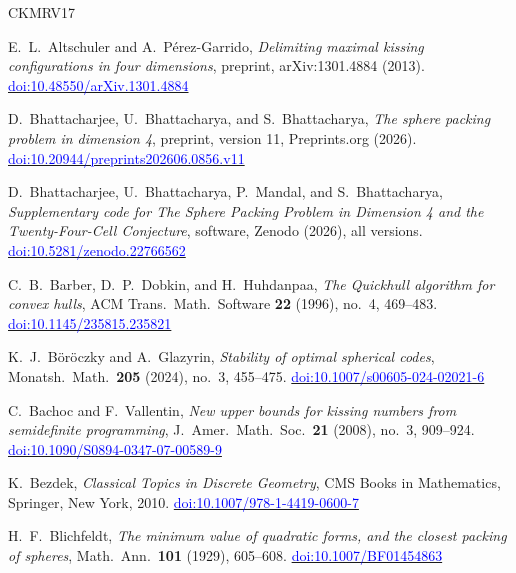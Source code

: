 \documentclass[11pt,reqno]{amsart}
\newcommand{\bluelink}[2]{\href{#1}{\textcolor{blue}{#2}}}
\renewcommand{\_}{\origunderscore\allowbreak}
\numberwithin{equation}{section}
\theoremstyle{plain}
\theoremstyle{definition}
\theoremstyle{remark}
\begin{document}



\begin{thebibliography}{CKMRV17}
\setlength{\itemsep}{-1.3pt}

E.~L.~Altschuler and A.~P\'erez-Garrido,
\textit{Delimiting maximal kissing configurations in four dimensions},
preprint, arXiv:1301.4884 (2013).
\bluelink{https://doi.org/10.48550/arXiv.1301.4884}{doi:10.48550/arXiv.1301.4884}

D.~Bhattacharjee, U.~Bhattacharya, and S.~Bhattacharya,
\textit{The sphere packing problem in dimension 4},
preprint, version 11, Preprints.org (2026).
\bluelink{https://doi.org/10.20944/preprints202606.0856.v11}{doi:10.20944/preprints202606.0856.v11}

D.~Bhattacharjee, U.~Bhattacharya, P.~Mandal, and S.~Bhattacharya,
\textit{Supplementary code for The Sphere Packing Problem in Dimension 4 and
the Twenty-Four-Cell Conjecture}, software, Zenodo (2026), all versions.
\bluelink{https://doi.org/10.5281/zenodo.22766562}{doi:10.5281/zenodo.22766562}

C.~B.~Barber, D.~P.~Dobkin, and H.~Huhdanpaa,
\textit{The Quickhull algorithm for convex hulls},
ACM Trans.\ Math.\ Software \textbf{22} (1996), no.~4, 469--483.
\bluelink{https://doi.org/10.1145/235815.235821}{doi:10.1145/235815.235821}

K.~J.~B\"or\"oczky and A.~Glazyrin, \textit{Stability of optimal spherical
codes}, Monatsh.\ Math.\ \textbf{205} (2024), no.~3, 455--475.
\bluelink{https://doi.org/10.1007/s00605-024-02021-6}{doi:10.1007/s00605-024-02021-6}

C.~Bachoc and F.~Vallentin,
\textit{New upper bounds for kissing numbers from semidefinite programming},
J.\ Amer.\ Math.\ Soc.\ \textbf{21} (2008), no.~3, 909--924.
\bluelink{https://doi.org/10.1090/S0894-0347-07-00589-9}{doi:10.1090/S0894-0347-07-00589-9}

K.~Bezdek,
\textit{Classical Topics in Discrete Geometry},
CMS Books in Mathematics, Springer, New York, 2010.
\bluelink{https://doi.org/10.1007/978-1-4419-0600-7}{doi:10.1007/978-1-4419-0600-7}

H.~F.~Blichfeldt,
\textit{The minimum value of quadratic forms, and the closest packing of spheres},
Math.\ Ann.\ \textbf{101} (1929), 605--608.
\bluelink{https://doi.org/10.1007/BF01454863}{doi:10.1007/BF01454863}


\end{thebibliography}
\end{document}
